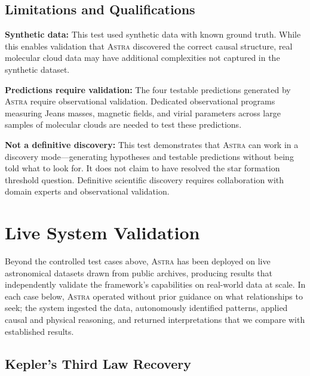 \documentclass[fleqn,usenatbib]{mnras}
\newcommand{\astra}{\textsc{Astra}\xspace}
\begin{document}
\subsection{Limitations and Qualifications}
\label{sec:tc6:limitations}

\textbf{Synthetic data:}
This test used synthetic data with known ground truth.
While this enables validation that \astra discovered the correct causal structure, real molecular cloud data may have additional complexities not captured in the synthetic dataset.

\textbf{Predictions require validation:}
The four testable predictions generated by \astra require observational validation.
Dedicated observational programs measuring Jeans masses, magnetic fields, and virial parameters across large samples of molecular clouds are needed to test these predictions.

\textbf{Not a definitive discovery:}
This test demonstrates that \astra can work in a discovery mode---generating hypotheses and testable predictions without being told what to look for.
It does not claim to have resolved the star formation threshold question.
Definitive scientific discovery requires collaboration with domain experts and observational validation.

\section{Live System Validation}
\label{sec:live}

Beyond the controlled test cases above, \astra has been deployed on live astronomical datasets drawn from public archives, producing results that independently validate the framework's capabilities on real-world data at scale.
In each case below, \astra operated without prior guidance on what relationships to seek; the system ingested the data, autonomously identified patterns, applied causal and physical reasoning, and returned interpretations that we compare with established results.

\subsection{Kepler's Third Law Recovery}
\label{sec:live:kepler}
\end{document}
